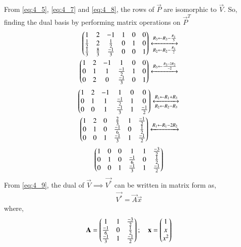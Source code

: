 \documentclass[journal,12pt,twocolumn]{IEEEtran}
\begin{document}
From \eqref{eq:4_5}, \eqref{eq:4_7} and \eqref{eq:4_8}, the rows of $\vec{P}$ are isomorphic to $\vec{V}$. So, finding the dual basis by performing matrix operations on $\vec{P}^T$
\begin{align}
    \begin{pmatrix}1 & 2 & -1 & 1 & 0 & 0 \\
    \frac{1}{2} & 2 & \frac{1}{2} & 0 & 1 & 0\\
    \frac{1}{3} & \frac{8}{3} & \frac{-1}{3} & 0 & 0 & 1\end{pmatrix} \xleftrightarrow[R_2\leftarrow R_2-\frac{R_1}{2}]{R_3\leftarrow R_3-\frac{R_1}{3}} \nonumber \\
    \begin{pmatrix}1 & 2 & -1 & 1 & 0 & 0 \\ 
    0 & 1 & 1 & \frac{-1}{2} & 1 & 0 \\
    0 & 2 & 0 & \frac{-1}{3} & 0 & 1\end{pmatrix}
    \xleftrightarrow[]{R_3 \leftarrow \frac{R_3-2R_2}{-2}} \nonumber
\end{align}
\begin{align}
    \begin{pmatrix}1 & 2 & -1 & 1 & 0 & 0 \\ 
    0 & 1 & 1 & \frac{-1}{2} & 1 & 0 \\
    0 & 0 & 1 & \frac{-1}{3} & 1 & \frac{-1}{2}\end{pmatrix} 
    \xleftrightarrow[R_2 \leftarrow R_2 - R_3]{R_1 \leftarrow R_1 + R_3} \nonumber \\
    \begin{pmatrix}1 & 2 & 0 & \frac{2}{3} & 1 & \frac{-1}{2} \\ 
    0 & 1 & 0 & \frac{-1}{6} & 0 & \frac{1}{2} \\
    0 & 0 & 1 & \frac{-1}{3} & 1 & \frac{-1}{2}\end{pmatrix} 
    \xleftrightarrow[]{R_1\leftarrow R_1-2R_2} \nonumber
\end{align}
\begin{align}
    \begin{pmatrix}1 & 0 & 0 & 1 & 1 & \frac{-3}{2} \\
    0 & 1 & 0 & \frac{-1}{6} & 0 & \frac{1}{2} \\
    0 & 0 & 1 & \frac{-1}{3} & 1 & \frac{-1}{2}\end{pmatrix} \label{eq:4_9}
\end{align}
From \eqref{eq:4_9}, the dual of $\vec{V} \implies \vec{V^*}$ can be written in matrix form as,
\begin{align}
    \vec{V^*} = \vec{A}\vec{x} \label{eq:4_10}
\end{align}
where,
\begin{align}
    \mathbf{A} = \begin{pmatrix}1 & 1 & \frac{-3}{2} \\
    \frac{-1}{6} & 0 & \frac{1}{2} \\
    \frac{-1}{3} & 1 & \frac{-1}{2}\end{pmatrix}; \quad 
    \mathbf{x} = \begin{pmatrix}1 \\ x \\ x^2\end{pmatrix} \nonumber
\end{align}
\end{document}
